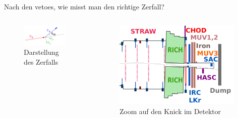 \documentclass[aspectratio=1610, professionalfonts, 9pt, t]{beamer}
\begin{document}
  \begin{frame}{Nach den vetoes, wie misst man den richtige Zerfall?}
      \begin{columns}[onlytextwidth]
        \begin{column}{0.5\textwidth}
          \begin{figure}[ht]
            \begin{center}
              \includegraphics[width=0.9\textwidth]{Images/na62missing.png} %
              \caption{Darstellung des Zerfalls}
            \end{center}
          \end{figure}
        \end{column}
        \begin{column}{0.5\textwidth}
          \begin{figure}[ht]
            \begin{center}
              \includegraphics[height=0.6\textheight]{Images/na62knick.png} %
              \caption{Zoom auf den Knick im Detektor}
            \end{center}
          \end{figure}
        \end{column}
      \end{columns}
  \end{frame}
\end{document}
